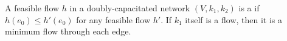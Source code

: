 A feasible flow $h$ in a doubly-capacitated network $(V, k_1, k_2)$ is a  if $h(e_0) \leq h'(e_0)$ for any feasible flow $h'$. If $k_1$ itself is a flow, then it is a minimum flow through each edge.
